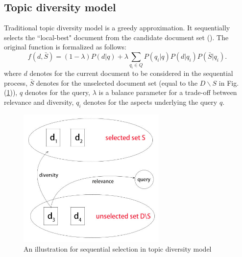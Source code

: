 \documentclass[review]{elsarticle}
\newcommand\revised[1]{{\color{black} #1}}
\begin{document}

\subsection{Topic diversity model}
\revised{
Traditional topic diversity model is a greedy approximation. It sequentially selects the ``local-best" document from the candidate document set (\cite{santos2010exploiting}). The original function is formalized as follows:}
\begin{equation}
	f(d, \bar{S})=(1-\lambda)P(d|q)+\lambda\sum_{q_i\in Q}P(q_i|q)P(d|q_i)P(\bar{S}|q_i).
	\label{eq1}
 \end{equation}
where $d$ denotes for the current document to be considered in the sequential process, $\bar{S}$ denotes for the unselected document set (equal to the $D\backslash S$ in Fig. (\ref{fig_rank})), $q$ denotes for the query, $\lambda$ is a balance parameter for a trade-off between relevance and diversity, $q_i$ denotes for the aspects underlying the query $q$. 

\begin{figure}[htb]
	\centering\includegraphics[width=0.65\textwidth]{fig_rank}
	\caption{An illustration for sequential selection in topic diversity model}
	\label{fig_rank}
\end{figure}
\end{document}

